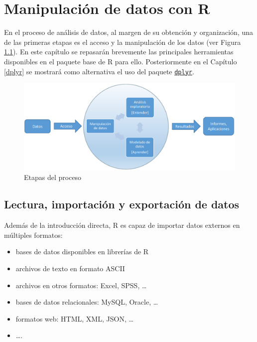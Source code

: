 \documentclass[
]{book}
\begin{document}
\hypertarget{manipulaciuxf3n-de-datos-con-r}{%
\chapter{Manipulación de datos con R}\label{manipulaciuxf3n-de-datos-con-r}}

En el proceso de análisis de datos, al margen de su obtención y organización, una de las primeras etapas es el acceso y la manipulación de los datos (ver Figura \ref{fig:esquema2}).
En este capítulo se repasarán brevemente las principales herramientas disponibles en el paquete base de R para ello.
Posteriormente en el Capítulo \ref{dplyr} se mostrará como alternativa el uso del paquete \href{https://dplyr.tidyverse.org/index.html}{\texttt{dplyr}}.

\begin{figure}[!htb]

{\centering \includegraphics[width=0.8\linewidth]{images/esquema2} 

}

\caption{Etapas del proceso}\label{fig:esquema2}
\end{figure}

\hypertarget{lectura-importaciuxf3n-y-exportaciuxf3n-de-datos}{%
\section{Lectura, importación y exportación de datos}\label{lectura-importaciuxf3n-y-exportaciuxf3n-de-datos}}

Además de la introducción directa, R es capaz de
importar datos externos en múltiples formatos:

\begin{itemize}
\item
  bases de datos disponibles en librerías de R
\item
  archivos de texto en formato ASCII
\item
  archivos en otros formatos: Excel, SPSS, \ldots{}
\item
  bases de datos relacionales: MySQL, Oracle, \ldots{}
\item
  formatos web: HTML, XML, JSON, \ldots{}
\item
  \ldots.
\end{itemize}
\end{document}
